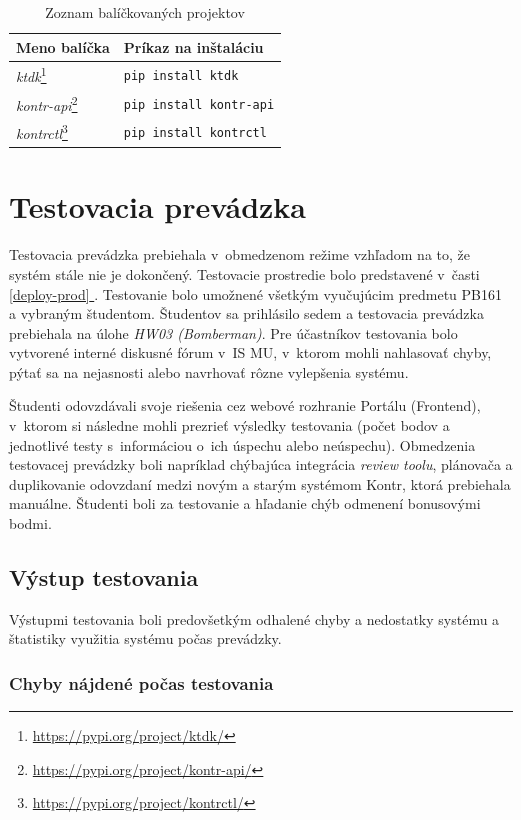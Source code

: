 \documentclass[
  digital, %
  oneside, %
  table,   %
  lof,     %
  lot,   %
]{fithesis3}
\newcommand*{\fullref}[1]{\hyperref[{#1}]{\ref*{#1} \nameref*{#1}}}
\newcommand*{\footurl}[1]{\footnote{\url{#1}}}
\begin{document}
\begin{table}[h]
\begin{tabular}{l l}
Meno balíčka & Príkaz na inštaláciu  \\ [0.5ex] 
\hline
\emph{ktdk}\footurl{https://pypi.org/project/ktdk/} & \texttt{pip install ktdk}  \\
\emph{kontr-api}\footurl{https://pypi.org/project/kontr-api/} & \texttt{pip install kontr-api}  \\
\emph{kontrctl}\footurl{https://pypi.org/project/kontrctl/} &  \texttt{pip install kontrctl} \\
\end{tabular}
\caption{Zoznam balíčkovaných projektov} \label{tab:packages}
\end{table}


\chapter{Testovacia prevádzka}

Testovacia prevádzka prebiehala v~obmedzenom režime vzhľadom na to, že systém stále nie je dokončený. Testovacie prostredie bolo predstavené v~časti \fullref{deploy-prod}. Testovanie bolo umožnené všetkým vyučujúcim predmetu PB161 a vybraným študentom. Študentov sa prihlásilo sedem a testovacia prevádzka prebiehala na úlohe \emph{HW03 (Bomberman)}. Pre účastníkov testovania bolo vytvorené interné diskusné fórum v~IS MU, v~ktorom mohli nahlasovať chyby, pýtať sa na nejasnosti alebo navrhovať rôzne vylepšenia systému.

Študenti odovzdávali svoje riešenia cez webové rozhranie Portálu (Frontend), v~ktorom si následne mohli prezrieť výsledky testovania (počet bodov a jednotlivé testy s~informáciou o~ich úspechu alebo neúspechu). Obmedzenia testovacej prevádzky boli napríklad chýbajúca integrácia \emph{review toolu}, plánovača a duplikovanie odovzdaní medzi novým a starým systémom Kontr, ktorá prebiehala manuálne. Študenti boli za testovanie a hľadanie chýb odmenení bonusovými bodmi.

\section{Výstup testovania}
Výstupmi testovania boli predovšetkým odhalené chyby a nedostatky systému a štatistiky využitia systému počas prevádzky.

\subsection{Chyby nájdené počas testovania}
\end{document}

